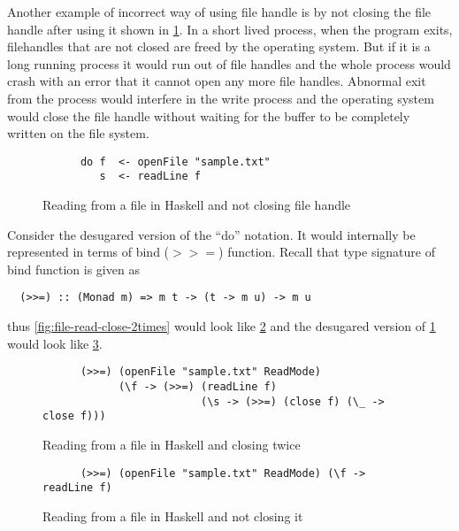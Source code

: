 Another example of incorrect way of using file handle is by not closing the file handle after using it shown in \cref{fig:file-read-noclose}.
In a short lived process, when the program exits, filehandles that are not closed are freed by the operating system.
But if it is a long running process it would run out of file handles and the whole process would crash with an error that
it cannot open any more file handles. Abnormal exit from the process would interfere in the write process
and the operating system would close the file handle without waiting for the buffer to be completely
written on the file system.
\begin{figure}[h]
  \begin{framed}
    \begin{verbatim}
      do f  <- openFile "sample.txt"
         s  <- readLine f
    \end{verbatim}
  \end{framed}
  \caption{Reading from a file in Haskell and not closing file handle}
  \label{fig:file-read-noclose}
\end{figure}

Consider the desugared version of the ``do'' notation. It would internally be represented
in terms of bind ($>>=$) function. Recall that type signature of bind function is given as
\begin{verbatim}
  (>>=) :: (Monad m) => m t -> (t -> m u) -> m u
\end{verbatim}
thus \cref{fig:file-read-close-2times} would look like \cref{fig:file-read-close-2times-desugared}
and the desugared version of \cref{fig:file-read-noclose} would look like \cref{fig:file-read-noclose-desugared}.

\begin{figure}[h]
  \begin{framed}
    \begin{verbatim}
      (>>=) (openFile "sample.txt" ReadMode)
            (\f -> (>>=) (readLine f)
                         (\s -> (>>=) (close f) (\_ -> close f)))
    \end{verbatim}
  \end{framed}
  \caption{Reading from a file in Haskell and closing twice}
  \label{fig:file-read-close-2times-desugared}
\end{figure}

\begin{figure}[h]
  \begin{framed}
    \begin{verbatim}
      (>>=) (openFile "sample.txt" ReadMode) (\f -> readLine f)
    \end{verbatim}
  \end{framed}
  \caption{Reading from a file in Haskell and not closing it}
  \label{fig:file-read-noclose-desugared}
\end{figure}

